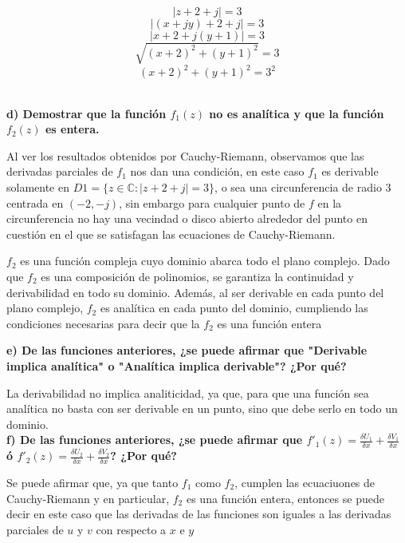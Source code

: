 \documentclass[12pt,a4paper]{report}
\begin{document}
$$|z+2+j|=3$$
$$|(x+jy)+2+j|=3$$
$$|x+2+j(y+1)|=3$$
$$\sqrt{(x+2)^2+(y+1)^2}=3$$
$$(x+2)^2+(y+1)^2=3^2$$\\

\begin{samepage}
\textbf{d) Demostrar que la función $f_1(z)$ no es analítica y que la función $f_2(z)$ es entera.}

\nopagebreak
Al ver los resultados obtenidos por Cauchy-Riemann, observamos que las derivadas parciales de $f_1$ nos dan una condición, en este caso $f_1$ es derivable solamente
en $D1 = \{z \in \mathbb{C} : |z + 2 + j| = 3\}$, o sea una circunferencia de radio $3$ centrada en $(-2, -j)$, sin embargo para cualquier punto de $f$ en la
circunferencia no hay una vecindad o disco abierto alrededor del punto en cuestión en el que se satisfagan las ecuaciones de Cauchy-Riemann.

\nopagebreak
$f_2$ es una función compleja cuyo dominio abarca todo el plano complejo. Dado que $f_2$ es una composición de polinomios, se garantiza la continuidad y
derivabilidad en todo su dominio. Además, al ser derivable en cada punto del plano complejo, $f_2$ es analítica en cada punto del dominio, cumpliendo las
condiciones necesarias para decir que la $f_2$ es una función entera\\
\end{samepage}

\textbf{e) De las funciones anteriores, ¿se puede afirmar que "Derivable implica analítica" o "Analítica implica derivable"? ¿Por qué?}

La derivabilidad no implica analiticidad, ya que, para que una función sea analítica no basta con ser derivable en un punto, sino  que debe serlo en todo un dominio.\\

\textbf{f) De las funciones anteriores, ¿se puede afirmar que $f'_1(z)=\frac{\delta U_1}{\delta x}+\frac{\delta V_1}{\delta x}$ \quad ó \quad 
$f'_2(z)=\frac{\delta U_2}{\delta x}+\frac{\delta V_2}{\delta x}$? ¿Por qué?}

Se puede afirmar que, ya que tanto $f_1$ como $f_2$, cumplen las ecuaciuones de Cauchy-Riemann y en particular, $f_2$ es una función entera, entonces se puede decir en este caso que 
las derivadas de las funciones son iguales a las derivadas parciales de $u$ y $v$ con respecto a $x$ e $y$

\chapter{}%
\end{document}
